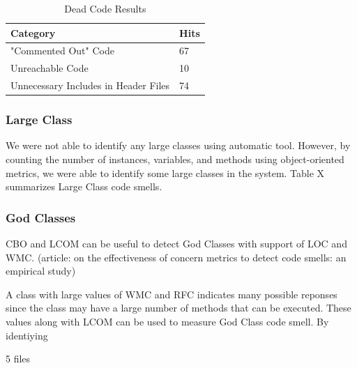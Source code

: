 \begin{table}[]
\centering
\caption{Dead Code Results}
\label{tab:deadCode}
\begin{tabular}{|l|l|}
\hline
\textbf{Category}		& 	\textbf{Hits} \\ \hline
"Commented Out" Code 			&	67  \\ \hline
Unreachable Code 	& 	10	 \\ \hline
Unnecessary Includes in Header Files 	& 	74	 \\ \hline
\end{tabular}
\end{table}


\subsubsection{Large Class}
We were not able to identify any large classes using automatic tool. However, by counting the number of instances, variables, and methods using object-oriented metrics, we were able to identify some large classes in the system. Table X summarizes Large Class code smells. 

\subsubsection{God Classes}
CBO and LCOM can be useful to detect God Classes with support of LOC and WMC. (article: on the effectiveness of concern metrics to detect code smells: an empirical study)

A class with large values of WMC and RFC indicates many possible reponses since the class may have a large number of methods that can be executed. These values along with LCOM can be used to measure God Class code smell. By identiying 

5 files











































